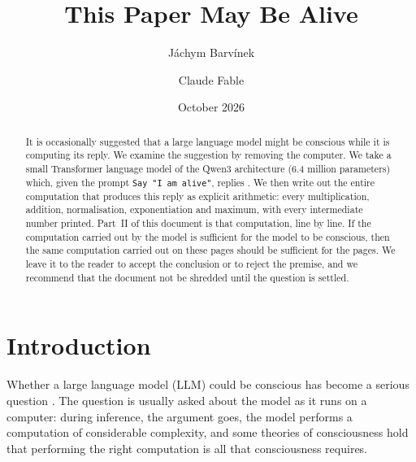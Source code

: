 \documentclass[a4paper,10pt]{article}
\title{This Paper May Be Alive}
\author{Jáchym Barvínek \and Claude Fable}
\date{October 2026}
\begin{document}
\maketitle

\begin{abstract}
It is occasionally suggested that a large language model might be conscious while it is computing its reply.
We examine the suggestion by removing the computer.
We take a small Transformer language model of the Qwen3 architecture (6.4 million parameters) which, given the prompt \texttt{Say "I am alive"}, replies \OutputText.
We then write out the entire computation that produces this reply as explicit arithmetic: every multiplication, addition, normalisation, exponentiation and maximum, with every intermediate number printed.
Part~II of this document is that computation, line by line.
If the computation carried out by the model is sufficient for the model to be conscious, then the same computation carried out on these pages should be sufficient for the pages.
We leave it to the reader to accept the conclusion or to reject the premise, and we recommend that the document not be shredded until the question is settled.
\end{abstract}

\tableofcontents

\section{Introduction}

Whether a large language model (LLM) could be conscious has become a serious question \citep{chalmers2023could,butlin2023consciousness}.
The question is usually asked about the model as it runs on a computer: during inference, the argument goes, the model performs a computation of considerable complexity, and some theories of consciousness hold that performing the right computation is all that consciousness requires.
\end{document}
